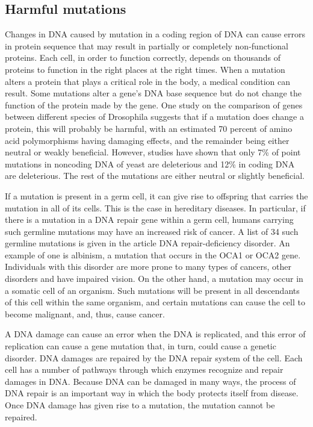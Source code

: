 \hypertarget{harmful-mutations}{%
\subsection{Harmful mutations}\label{harmful-mutations}}

Changes in DNA caused by mutation in a coding region of DNA can cause errors in protein sequence that may result in partially or completely non-functional proteins. Each cell, in order to function correctly, depends on thousands of proteins to function in the right places at the right times. When a mutation alters a protein that plays a critical role in the body, a medical condition can result. Some mutations alter a gene's DNA base sequence but do not change the function of the protein made by the gene. One study on the comparison of genes between different species of Drosophila suggests that if a mutation does change a protein, this will probably be harmful, with an estimated 70 percent of amino acid polymorphisms having damaging effects, and the remainder being either neutral or weakly beneficial. However, studies have shown that only 7\% of point mutations in noncoding DNA of yeast are deleterious and 12\% in coding DNA are deleterious. The rest of the mutations are either neutral or slightly beneficial.

If a mutation is present in a germ cell, it can give rise to offspring that carries the mutation in all of its cells. This is the case in hereditary diseases. In particular, if there is a mutation in a DNA repair gene within a germ cell, humans carrying such germline mutations may have an increased risk of cancer. A list of 34 such germline mutations is given in the article DNA repair-deficiency disorder. An example of one is albinism, a mutation that occurs in the OCA1 or OCA2 gene. Individuals with this disorder are more prone to many types of cancers, other disorders and have impaired vision. On the other hand, a mutation may occur in a somatic cell of an organism. Such mutations will be present in all descendants of this cell within the same organism, and certain mutations can cause the cell to become malignant, and, thus, cause cancer.

A DNA damage can cause an error when the DNA is replicated, and this error of replication can cause a gene mutation that, in turn, could cause a genetic disorder. DNA damages are repaired by the DNA repair system of the cell. Each cell has a number of pathways through which enzymes recognize and repair damages in DNA. Because DNA can be damaged in many ways, the process of DNA repair is an important way in which the body protects itself from disease. Once DNA damage has given rise to a mutation, the mutation cannot be repaired.

